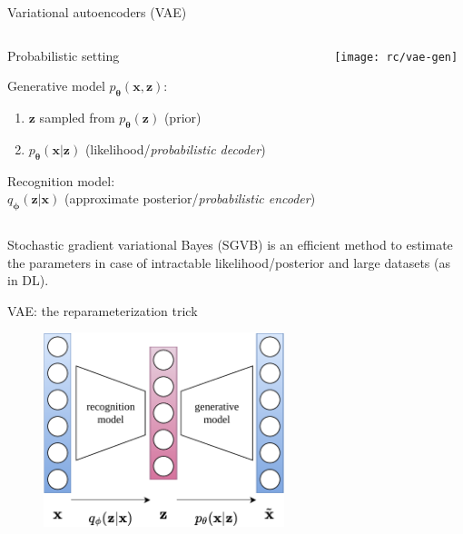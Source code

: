 \documentclass{beamer}
\begin{document}
  \begin{frame}{Variational autoencoders (VAE)}
    
    \begin{columns}[T,onlytextwidth]

      \begin{block}{Probabilistic setting}
        \small{
        Generative model $p_{\boldsymbol{\theta}}(\mathbf{x}, \mathbf{z})$:
        \begin{enumerate}
          \item $\mathbf{z}$ sampled from $p_{\boldsymbol{\theta}}(\mathbf{z})$ (prior)
          \item $p_{\boldsymbol{\theta}}(\mathbf{x}|\mathbf{z})$ (likelihood/\emph{probabilistic decoder})
        \end{enumerate}
        Recognition model:\\
        $q_{\boldsymbol{\phi}}(\mathbf{z}|\mathbf{x})$ (approximate posterior/\emph{probabilistic encoder})
        }
      \end{block}

      \texttt{[image: rc/vae-gen]}
      
    \end{columns}
    
    Stochastic gradient variational Bayes (SGVB) \cite{Kingma2014} is an efficient method to estimate the parameters in case of intractable likelihood/posterior and large datasets (as in DL).


  \end{frame}

  \begin{frame}{VAE: the reparameterization trick}

    \begin{figure}
      \includegraphics[width=7cm]{rc/vae}
    \end{figure}

  \end{frame}
\end{document}
